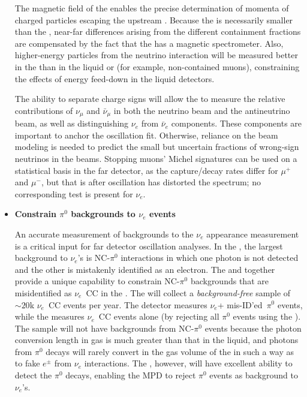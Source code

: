 \begin{itemize}
{The magnetic field of the  enables the precise determination of momenta of charged particles escaping the upstream . %
Because the  is necessarily smaller than the , near-far differences arising from the different containment fractions are compensated by the fact that the  has a magnetic spectrometer.  Also, higher-energy particles from the neutrino interaction will be measured better in the  than in the liquid  or  (for example, non-contained muons), constraining the effects of energy feed-down in the liquid detectors.

The ability to separate charge signs will allow the  to measure the relative contributions of $\nu_\mu$ and $\bar{\nu}_\mu$ in both the neutrino beam and the antineutrino beam, as well as distinguishing $\nu_e$ from $\bar{\nu}_e$ components.  These components are important to anchor the oscillation fit. Otherwise, reliance on the beam modeling is needed to predict the small but uncertain fractions of wrong-sign neutrinos in the beams.  Stopping muons' Michel signatures can be used on a statistical basis in the far detector, as the capture/decay rates differ for $\mu^+$ and $\mu^-$, but that is after oscillation has distorted the spectrum; no corresponding test is present for $\nu_e$.
}

\item {{\bf Constrain $\pi^0$ backgrounds to $\nu_e$ events}


An accurate measurement of backgrounds to the $\nu_e$ appearance measurement is a critical input for far detector oscillation analyses. In the , the largest background to $\nu_e$'s is NC-$\pi^0$ interactions in which one photon is not detected and the other is mistakenly identified as an electron. The  and  together provide a unique capability to constrain NC-$\pi^0$ backgrounds that are misidentified as $\nu_e$~CC in the . The  will collect a {\it{background-free}} sample of $\sim20$k $\nu_e$~CC events per year. The  detector measures $\nu_e$+ mis-ID'ed~$\pi^0$ events, while the  measures $\nu_e$~CC events alone (by rejecting all $\pi^0$ events using the ). The  sample will not have backgrounds from NC-$\pi^0$ events because the photon conversion length in gas is much greater than that in the liquid, and photons from $\pi^0$ decays will rarely convert in the gas volume of the  in such a way as to fake $e^\pm$ from $\nu_e$ interactions. The , however, will have excellent ability to detect the $\pi^0$ decays, enabling the MPD to reject $\pi^0$ events as background to $\nu_e$'s.

}
\end{itemize}
